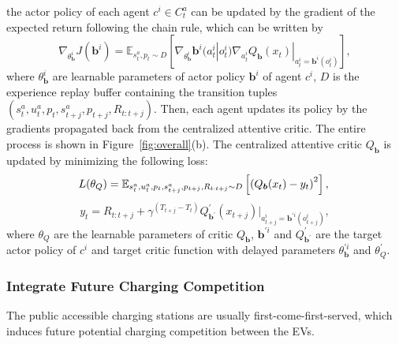 \documentclass[sigconf]{acmart}
\newcommand{\hao}[1]{{\color{black}{#1}}}
\newcommand{\jia}[1]{{\color{black}{#1}}}
\newcommand{\eat}[1]{}
\newcommand\figref[1]{Figure~\ref{#1}}
\begin{document}
\hao{Given the state $s^a_t$, joint action $u^a_t$, and future information $p_t$ of active agents,}
the actor policy of each agent $c^i \in C^a_t$ can be updated by the gradient of the expected return following the chain rule, which can be written by
\begin{equation}\label{equ:gradient}
\nabla_{\theta^i_{\bm{b}}}J(\bm{b}^i)=\mathbb{E}_{s^a_t,p_t \sim D}\left[\nabla_{\theta^i_{\bm{b}}}\bm{b}^i(a^i_t|o^i_t)\nabla_{a_t^i} Q_{\bm{b}}(x_t)|_{a_t^i=\bm{b}^i(o_t^i)}\right],
\end{equation}
where $\theta^i_{\bm{b}}$ are learnable parameters of actor policy $\bm{b}^i$ of agent $c^i$, $D$ is the experience replay buffer containing the transition tuples $(s_t^a,u_t^a,p_t,s_{t+j}^a,p_{t+j},R_{t:t+j})$.
Then, each agent updates its policy by the gradients propagated back from the centralized attentive critic. The entire process is shown in \figref{fig:overall}(b).
\jia{As the centralized attentive critic perceived more complete information of all active agents, it can motivate the agents to learn policies in a coordinated and cooperative way.}
The centralized attentive critic $Q_{\bm{b}}$ is updated by minimizing the following loss:
\begin{equation}
\label{equ:gradient1}
L(\theta_Q)=\mathbb{E}_{s_t^a,u_t^a,p_t,s_{t+j}^a,p_{t+j},R_{t:t+j} \sim D}\left[\left(Q_{\bm{b}}(x_t)-y_t\right)^2\right],\\
\end{equation}
\begin{equation}
\label{equ:gradient2}
y_t=R_{t:t+j}+\gamma^{(T_{t+j}-T_{t})}Q^{'}_{\bm{b}^{'}}(x_{t+j})|_{a_{t+j}^i=\bm{b}^{'i}(o_{t+j}^i)}, 
\end{equation}
where $\theta_Q$ are the learnable parameters of critic $Q_{\bm{b}}$, $\bm{b}^{'i}$ and $Q^{'}_{\bm{b}^{'}}$ are the target actor policy of $c^i$ and target critic function with delayed parameters $\theta_{\bm{b}}^{'i}$ and $\theta_Q^{'}$.

\subsubsection{\textbf{Integrate Future Charging Competition}}\label{sec:competition}
The public accessible charging stations are usually first-come-first-served, which induces future potential charging competition between the \hao{continuously arriving} EVs. 
\hao{Recommending charging requests without considering future potential competition will lead to extra CWT or even charging failure.
However, it is a non-trivial task to incorporate the future competition since we can not know the precise amount of forthcoming EVs and available charging spots at a future step in advance.
} 
\eat{due to the future uncertainties.} 
\end{document}
